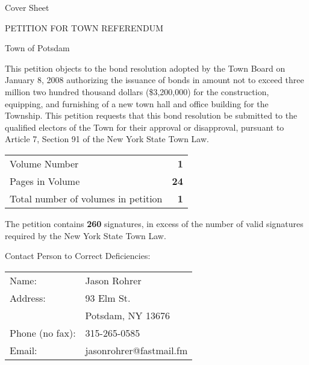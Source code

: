 \documentclass[12pt]{article}
\begin{document}
\begin{center}
Cover Sheet
\vspace{0.25in}

PETITION FOR TOWN REFERENDUM

\vspace{0.25in}
Town of Potsdam

\end{center}

This petition objects to the bond resolution adopted by the Town Board on January 8, 2008 authorizing the issuance of bonds in amount not to exceed three million two hundred thousand dollars (\$3,200,000) for the construction, equipping, and furnishing of a new town hall and office building for the Township.  This petition requests that this bond resolution be submitted to the qualified electors of the Town for their approval or disapproval, pursuant to Article 7, Section 91 of the New York State Town Law.

\vspace{1in}

\begin{center}

\begin{tabular}{lr}
Volume Number &{\bf 1}\\
Pages in Volume &{\bf 24}\\

Total number of volumes in petition & {\bf 1}
\end{tabular}

\end{center}

\vspace{1in}

The petition contains {\bf 260} signatures, in excess of the number of valid signatures required by the New York State Town Law.

\vspace{0.5in}

Contact Person to Correct Deficiencies:

\begin{center}
\begin{tabular}{ll}
Name: &Jason Rohrer\\
Address: &93 Elm St.\\
&Potsdam, NY 13676\\
Phone (no fax): &315-265-0585\\
Email: &jasonrohrer@fastmail.fm
\end{tabular}
\end{center}
\end{document}
